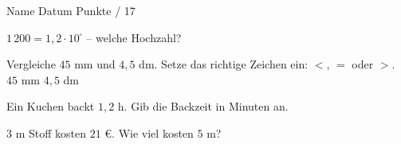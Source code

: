 \documentclass[11pt]{article}
\begin{document}
{}
\par\vspace{2pt}\noindent Name \underline{\hspace{7cm}}\hfill Datum \underline{\hspace{3cm}}\hfill Punkte \underline{\hspace{1.2cm}} / 17\par\vspace{6pt}
\small

\noindent\begin{minipage}[t]{0.485\linewidth}\raggedright
\begin{aufgabe}{$1\,200 = 1{,}2 \cdot 10^{\square}$ – welche Hochzahl? \leerfeld}
\end{aufgabe}
\end{minipage}\hfill\begin{minipage}[t]{0.485\linewidth}\raggedright
\begin{aufgabe}{Vergleiche $45$ mm und $4{,}5$ dm. Setze das richtige Zeichen ein: $<$, $=$ oder $>$. $45$ mm \leerfeld $4{,}5$ dm}
\end{aufgabe}
\end{minipage}\par

\noindent\begin{minipage}[t]{0.485\linewidth}\raggedright
\begin{aufgabe}{Ein Kuchen backt $1{,}2$ h. Gib die Backzeit in Minuten an. \leerfeld[min]}
\end{aufgabe}
\end{minipage}\hfill\begin{minipage}[t]{0.485\linewidth}\raggedright
\begin{aufgabe}{$3$ m Stoff kosten $21$ €. Wie viel kosten $5$ m? \leerfeld[€]}
\end{aufgabe}
\end{minipage}\par
\end{document}
